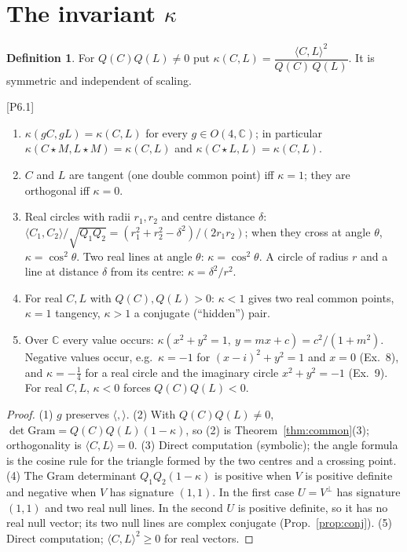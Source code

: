 \documentclass[11pt]{article}
\theoremstyle{definition}\newtheorem{definition}[theorem]{Definition}\newtheorem{remark}[theorem]{Remark}\newtheorem{example}[theorem]{Example}
\newcommand{\C}{\mathbb{C}}\newcommand{\R}{\mathbb{R}}\newcommand{\PP}{\mathbb{P}}
\newcommand{\ip}[2]{\langle #1,#2\rangle}\newcommand{\pt}{\mathrm{pt}}\newcommand{\Qd}{\mathcal{Q}}
\newcommand{\chk}[1]{\hfill{\footnotesize\textsf{[#1]}}}
\begin{document}
\section{The invariant \texorpdfstring{$\kappa$}{kappa}}\label{sec:kappa}
\begin{definition} For $Q(C)Q(L)\ne0$ put $\kappa(C,L)=\dfrac{\ip CL^2}{Q(C)\,Q(L)}$. It is symmetric and independent of scaling. \end{definition}
\begin{proposition}\label{prop:kappa}\chk{P6.1}
\begin{enumerate}
\item $\kappa(gC,gL)=\kappa(C,L)$ for every $g\in O(4,\C)$; in particular $\kappa(C\star M,L\star M)=\kappa(C,L)$ and $\kappa(C\star L,L)=\kappa(C,L)$.
\item $C$ and $L$ are tangent (one double common point) iff $\kappa=1$; they are orthogonal iff $\kappa=0$.
\item Real circles with radii $r_1,r_2$ and centre distance $\delta$: $\ip{C_1}{C_2}/\sqrt{Q_1Q_2}=(r_1^2+r_2^2-\delta^2)/(2r_1r_2)$; when they cross at angle $\theta$, $\kappa=\cos^2\theta$. Two real lines at angle $\theta$: $\kappa=\cos^2\theta$. A circle of radius $r$ and a line at distance $\delta$ from its centre: $\kappa=\delta^2/r^2$.
\item For real $C,L$ with $Q(C),Q(L)>0$: $\kappa<1$ gives two real common points, $\kappa=1$ tangency, $\kappa>1$ a conjugate (``hidden'') pair.
\item Over $\C$ every value occurs: $\kappa(x^2+y^2=1,\ y=mx+c)=c^2/(1+m^2)$. Negative values occur, e.g.\ $\kappa=-1$ for $(x-i)^2+y^2=1$ and $x=0$ (Ex.~8), and $\kappa=-\tfrac14$ for a real circle and the imaginary circle $x^2+y^2=-1$ (Ex.~9). For real $C,L$, $\kappa<0$ forces $Q(C)Q(L)<0$.
\end{enumerate}
\end{proposition}
\begin{proof}
(1) $g$ preserves $\ip{}{}$. (2) With $Q(C)Q(L)\ne0$, $\det\mathrm{Gram}=Q(C)Q(L)(1-\kappa)$, so (2) is Theorem~\ref{thm:common}(3); orthogonality is $\ip CL=0$. (3) Direct computation (symbolic); the angle formula is the cosine rule for the triangle formed by the two centres and a crossing point. (4) The Gram determinant $Q_1Q_2(1-\kappa)$ is positive when $V$ is positive definite and negative when $V$ has signature $(1,1)$. In the first case $U=V^\perp$ has signature $(1,1)$ and two real null lines. In the second $U$ is positive definite, so it has no real null vector; its two null lines are complex conjugate (Prop.~\ref{prop:conj}). (5) Direct computation; $\ip CL^2\geq0$ for real vectors.
\end{proof}
\end{document}

